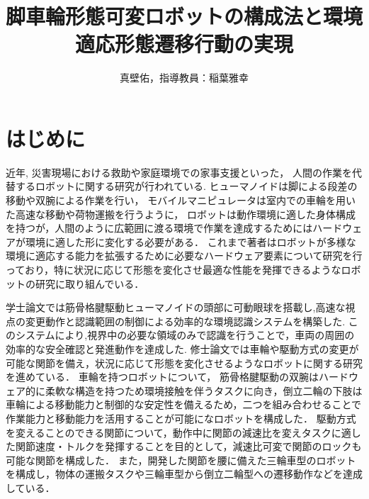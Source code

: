 \documentclass[twocolumn]{d-abst}
\title{脚車輪形態可変ロボットの構成法と環境適応形態遷移行動の実現}
\author{真壁佑，指導教員：稲葉雅幸}
\begin{document}
\pagestyle{empty}
\maketitle
\thispagestyle{empty}
\sloppy

\section{はじめに}
近年, 災害現場における救助や家庭環境での家事支援といった， 人間の作業を代替するロボットに関する研究が行われている.
ヒューマノイドは脚による段差の移動や双腕による作業を行い， モバイルマニピュレータは室内での車輪を用いた高速な移動や荷物運搬を行うように， ロボットは動作環境に適した身体構成を持つが，人間のように広範囲に渡る環境で作業を達成するためにはハードウェアが環境に適した形に変化する必要がある．
これまで著者はロボットが多様な環境に適応する能力を拡張するために必要なハードウェア要素について研究を行っており，特に状況に応じて形態を変化させ最適な性能を発揮できるようなロボットの研究に取り組んでいる．

学士論文では筋骨格腱駆動ヒューマノイドの頭部に可動眼球を搭載し,高速な視点の変更動作と認識範囲の制御による効率的な環境認識システムを構築した.
このシステムにより,視界中の必要な領域のみで認識を行うことで，車両の周囲の効率的な安全確認と発進動作を達成した\cite{makabe2018eye}.
修士論文では車輪や駆動方式の変更が可能な関節を備え，状況に応じて形態を変化させるようなロボットに関する研究を進めている．
車輪を持つロボットについて，%
筋骨格腱駆動の双腕はハードウェア的に柔軟な構造を持つため環境接触を伴うタスクに向き，倒立二輪の下肢は車輪による移動能力と制御的な安定性を備えるため，二つを組み合わせることで作業能力と移動能力を活用することが可能になロボットを構成した\cite{kawaharazuka2018twimp}．
駆動方式を変えることのできる関節について，動作中に関節の減速比を変えタスクに適した関節速度・トルクを発揮することを目的として，減速比可変で関節のロックも可能な関節を構成した．
また，開発した関節を腰に備えた三輪車型のロボットを構成し，物体の運搬タスクや三輪車型から倒立二輪型への遷移動作などを達成している\cite{makabe2019module}．
\end{document}
